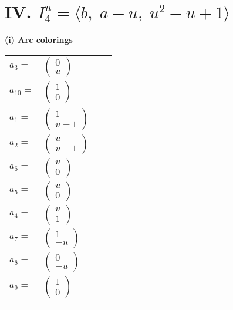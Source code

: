 \documentclass[1p]{elsarticle_modified}
\theoremstyle{definition}
\begin{document}
\centering \section*{IV. $I^u_{4}= \langle b,\;a- u,\;u^2- u+1 \rangle$}
\flushleft \textbf{(i) Arc colorings}\\
\begin{tabular}{m{7pt} m{180pt} m{7pt} m{180pt} }
\flushright $a_{3}=$&$\begin{pmatrix}0\\u\end{pmatrix}$ \\
\flushright $a_{10}=$&$\begin{pmatrix}1\\0\end{pmatrix}$ \\
\flushright $a_{1}=$&$\begin{pmatrix}1\\u-1\end{pmatrix}$ \\
\flushright $a_{2}=$&$\begin{pmatrix}u\\u-1\end{pmatrix}$ \\
\flushright $a_{6}=$&$\begin{pmatrix}u\\0\end{pmatrix}$ \\
\flushright $a_{5}=$&$\begin{pmatrix}u\\0\end{pmatrix}$ \\
\flushright $a_{4}=$&$\begin{pmatrix}u\\1\end{pmatrix}$ \\
\flushright $a_{7}=$&$\begin{pmatrix}1\\- u\end{pmatrix}$ \\
\flushright $a_{8}=$&$\begin{pmatrix}0\\- u\end{pmatrix}$ \\
\flushright $a_{9}=$&$\begin{pmatrix}1\\0\end{pmatrix}$\\&\end{tabular}
\end{document}
